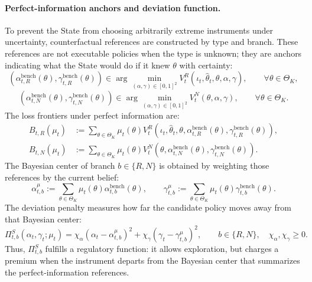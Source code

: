 \documentclass[12pt,a4paper]{article}
\theoremstyle{plain}
\theoremstyle{definition}
\theoremstyle{remark}
\newcommand{\1}{\mathbf{1}}
\begin{document}
\paragraph{Perfect-information anchors and deviation function.}
To prevent the State from choosing arbitrarily extreme instruments under uncertainty, counterfactual references are constructed by type and branch. These references are not executable policies when the type is unknown; they are anchors indicating what the State would do if it knew $\theta$ with certainty:
\begin{equation}
\label{eq:benchmark-rescue-type}
(\alpha_{t,R}^{\mathrm{bench}}(\theta),\gamma_{t,R}^{\mathrm{bench}}(\theta))
\in
\arg\min_{(\alpha,\gamma)\in[0,1]^2}
V_t^R(\iota_t,\hat{\theta}_t,\theta,\alpha,\gamma),
\qquad \forall\theta\in\Theta_K,
\end{equation}
\begin{equation}
\label{eq:benchmark-neg-type}
(\alpha_{t,N}^{\mathrm{bench}}(\theta),\gamma_{t,N}^{\mathrm{bench}}(\theta))
\in
\arg\min_{(\alpha,\gamma)\in[0,1]^2}
V_t^N(\theta,\alpha,\gamma),
\qquad \forall\theta\in\Theta_K.
\end{equation}
The loss frontiers under perfect information are:
\begin{equation}
\label{eq:benchmark-perfect-info}
\begin{aligned}
B_{t,R}(\mu_t)
&:=
\sum_{\theta\in\Theta_K}\mu_t(\theta)
V_t^R\!\left(\iota_t,\hat{\theta}_t,\theta,
\alpha_{t,R}^{\mathrm{bench}}(\theta),
\gamma_{t,R}^{\mathrm{bench}}(\theta)\right),\\
B_{t,N}(\mu_t)
&:=
\sum_{\theta\in\Theta_K}\mu_t(\theta)
V_t^N\!\left(\theta,
\alpha_{t,N}^{\mathrm{bench}}(\theta),
\gamma_{t,N}^{\mathrm{bench}}(\theta)\right).
\end{aligned}
\end{equation}
The Bayesian center of branch $b\in\{R,N\}$ is obtained by weighting those references by the current belief:
\begin{equation}
\label{eq:belief-weighted-policy}
\alpha_{t,b}^{\mu}
:=
\sum_{\theta\in\Theta_K}\mu_t(\theta)\alpha_{t,b}^{\mathrm{bench}}(\theta),
\qquad
\gamma_{t,b}^{\mu}
:=
\sum_{\theta\in\Theta_K}\mu_t(\theta)\gamma_{t,b}^{\mathrm{bench}}(\theta).
\end{equation}
The deviation penalty measures how far the candidate policy moves away from that Bayesian center:
\begin{equation}
\label{eq:prima-desviacion}
\Pi_{t,b}^S(\alpha_t,\gamma_t;\mu_t)
=
\chi_\alpha(\alpha_t-\alpha_{t,b}^{\mu})^2
+\chi_\gamma(\gamma_t-\gamma_{t,b}^{\mu})^2,
\qquad b\in\{R,N\},\quad \chi_\alpha,\chi_\gamma\ge 0.
\end{equation}
Thus, $\Pi_{t,b}^S$ fulfills a regulatory function: it allows exploration, but charges a premium when the instrument departs from the Bayesian center that summarizes the perfect-information references.
\end{document}
